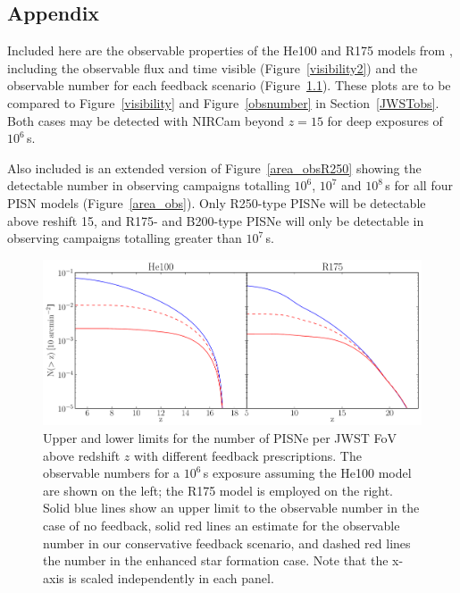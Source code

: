 \documentclass{thesis}
\newcommand{\RefFig}[1]{\mbox{Figure~\ref{#1}}}
\newcommand{\RefSec}[1]{\mbox{Section~\ref{#1}}}
\begin{document}
\begin{appendix}
\chapter{Appendix}
\label{appendix}
Included here are the observable properties of the He100 and R175 models from
\citet{KasenWoosleyHeger2011}, including the observable flux and time visible 
(\RefFig{visibility2}) and the observable number for each feedback scenario 
(\RefFig{obsnumber2}).  These plots are to be compared to
\RefFig{visibility} and \RefFig{obsnumber} in \RefSec{JWSTobs}.  Both
cases may be detected with NIRCam beyond $z=15$ for deep exposures of
$10^6\,$s.

Also included is an extended version of \RefFig{area_obsR250} showing
the detectable number in observing campaigns totalling $10^6$, $10^7$
and $10^8\,$s for all four PISN models (\RefFig{area_obs}). Only
R250-type PISNe will be detectable above reshift 15, and R175- and
B200-type PISNe will only be detectable in observing campaigns
totalling greater than $10^7\,$s.

\begin{figure}[h!]
 \begin{center}
   \includegraphics[width=12.85cm]{observableNumber2}
   \caption{\footnotesize Upper and lower limits for the number of
     PISNe per JWST FoV above redshift $z$ with different feedback
     prescriptions. The observable numbers for a $10^6\,$s exposure
     assuming the He100 model are shown on the left; the R175 model is
     employed on the right. Solid blue lines show an upper limit
     to the observable number in the case of no feedback, solid red
     lines an estimate for the observable number in our conservative
     feedback scenario, and dashed red lines the number in the
     enhanced star formation case. Note that the x-axis is scaled
     independently in each panel.  }
   \label{obsnumber2}
 \end{center}
\end{figure} 


\end{appendix}
\end{document}

